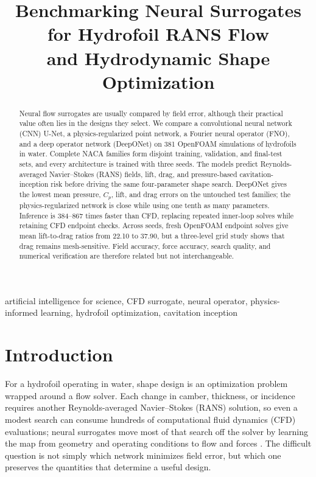 \documentclass[conference]{IEEEtran}
\title{Benchmarking Neural Surrogates for Hydrofoil RANS Flow\\
and Hydrodynamic Shape Optimization}
\author{\IEEEauthorblockN{Aarav Dixit}
\IEEEauthorblockA{aardixit7@gmail.com}}
\begin{document}
\maketitle

\begin{abstract}
Neural flow surrogates are usually compared by field error, although their
practical value often lies in the designs they select. We compare a
convolutional neural network (CNN) U-Net, a physics-regularized point
network, a Fourier neural operator (FNO), and a deep operator network
(DeepONet) on 381 OpenFOAM simulations of hydrofoils in water. Complete NACA
families form disjoint training, validation, and final-test sets, and every
architecture is trained with three seeds. The models predict
Reynolds-averaged Navier--Stokes (RANS) fields, lift, drag, and pressure-based
cavitation-inception risk before driving the same four-parameter shape search.
DeepONet gives the lowest mean pressure, $C_p$, lift, and drag errors on the
untouched test families; the physics-regularized network is close while using
one tenth as many parameters. Inference is 384--867 times faster than CFD,
replacing repeated inner-loop solves while retaining CFD endpoint checks.
Across seeds, fresh OpenFOAM endpoint solves give mean lift-to-drag ratios from
22.10 to 37.90, but a three-level grid study shows that drag remains
mesh-sensitive. Field accuracy, force accuracy, search quality, and numerical
verification are therefore related but not interchangeable.
\end{abstract}

\begin{IEEEkeywords}
artificial intelligence for science, CFD surrogate, neural operator, physics-informed learning, hydrofoil optimization, cavitation inception
\end{IEEEkeywords}

\section{Introduction}
For a hydrofoil operating in water, shape design is an optimization problem
wrapped around a flow solver. Each change in camber, thickness, or incidence
requires another Reynolds-averaged Navier--Stokes (RANS) solution, so even a
modest search can consume hundreds of computational fluid dynamics (CFD)
evaluations; neural surrogates move most of that search off the solver by
learning the map from geometry and operating conditions to flow and forces
\cite{brunton2020machine}. The difficult question is not simply which network
minimizes field error, but which one preserves the quantities that determine a
useful design.
\end{document}
